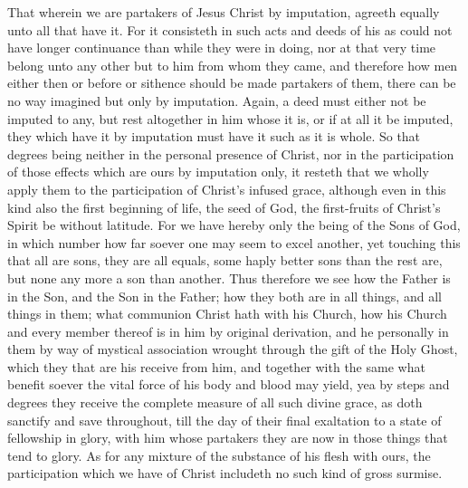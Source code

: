That wherein we are partakers of Jesus Christ by imputation, agreeth equally unto all that have it. For it consisteth in such acts and deeds of his as could not have longer continuance than while they were in doing, nor at that very time belong unto any other but to him from whom they came, and therefore how men either then or before or sithence should be made partakers of them, there can be no way imagined but only by imputation. Again, a deed must either not be imputed to any, but rest altogether in him whose it is, or if at all it be imputed, they which have it by imputation must have it such as it is whole. So that degrees being neither in the personal presence of Christ, nor in the participation of those effects which are ours by imputation only, it resteth that we wholly apply them to the participation of Christ’s infused grace, although even in this kind also the first  beginning of life, the seed of God, the first-fruits of Christ’s Spirit be without latitude. For we have hereby only the being of the Sons of God, in which number how far soever one may seem to excel another, yet touching this that all are sons, they are all equals, some haply better sons than the rest are, but none any more a son than another.
Thus therefore we see how the Father is in the Son, and the Son in the Father; how they both are in all things, and all things in them; what communion Christ hath with his Church, how his Church and every member thereof is in him by original derivation, and he personally in them by way of mystical association wrought through the gift of the Holy Ghost, which they that are his receive from him, and together with the same what benefit soever the vital force of his body and blood may yield, yea by steps and degrees they receive the complete measure of all such divine grace, as doth sanctify and save throughout, till the day of their final exaltation to a state of fellowship in glory, with him whose partakers they are now in those things that tend to glory. As for any mixture of the substance of his flesh with ours, the participation which we have of Christ includeth no such kind of gross surmise.

